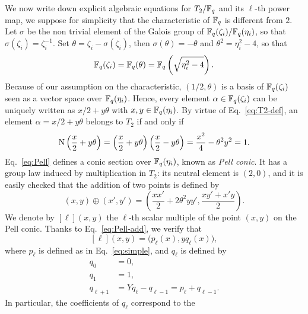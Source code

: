 \documentclass{sig-alternate}
\begin{document}
We now write down explicit algebraic equations for $T_2/\mathbb{F}_q$ and its
$\ell$-th power map, we suppose for simplicity that the characteristic
of $\mathbb{F}_q$ is different from $2$. Let $\sigma$ be the non trivial
element of the Galois group of $\mathbb{F}_q(\zeta_i)/\mathbb{F}_q(\eta_i)$, so that
$\sigma(\zeta_i)=\zeta_i^{-1}$. Set $\theta = \zeta_i -
\sigma(\zeta_i)$, then $\sigma(\theta)=-\theta$ and $\theta^2 =
\eta_i^2-4$, so that
\begin{equation}
  \mathbb{F}_q(\zeta_i) = \mathbb{F}_q(\theta) = \mathbb{F}_q\left(\sqrt{\eta_i^2-4}\right).
\end{equation}
Because of our assumption on the characteristic, $(1/2, \theta)$ is a
basis of $\mathbb{F}_q(\zeta_i)$ seen as a vector space over
$\mathbb{F}_q(\eta_i)$. Hence, every element $\alpha\in\mathbb{F}_q(\zeta_i)$ can be
uniquely written as $x/2 + y\theta$ with $x,y\in\mathbb{F}_q(\eta_i)$. By
virtue of Eq.~\eqref{eq:T2-def}, an element $\alpha=x/2+y\theta$
belongs to $T_2$ if and only if
\begin{equation}
  \label{eq:Pell}
  \operatorname{N}\left(\frac{x}{2} + y\theta\right) = 
  \left(\frac{x}{2} + y\theta\right)\left(\frac{x}{2} - y\theta\right) =
  \frac{x^2}{4} - \theta^2y^2 = 1.
\end{equation}
Eq.~\eqref{eq:Pell} defines a conic section over $\mathbb{F}_q(\eta_i)$, known
as \emph{Pell conic}. It has a group law induced by multiplication in
$T_2$: its neutral element is $(2,0)$, and it is easily checked that
the addition of two points is defined by
\begin{equation}
  \label{eq:Pell-add}
  (x,y)\oplus(x',y') =
  \left(\frac{xx'}{2} + 2\theta^2yy', \frac{xy' + x'y}{2}\right).
\end{equation}
We denote by $[\ell](x,y)$ the $\ell$-th scalar multiple of the point
$(x,y)$ on the Pell conic. Thanks to Eq.~\eqref{eq:Pell-add}, we
verify that
\begin{equation}
  \label{eq:Pell-rec}
  [\ell](x,y) = \bigr(p_\ell(x), yq_\ell(x)\bigl),
\end{equation}
where $p_\ell$ is defined as in Eq.~\eqref{eq:simple}, and $q_\ell$ is
defined by
\begin{equation}
  \label{eq:fibonacci}
  \begin{aligned}
    q_0 &= 0,\\
    q_1 &= 1,\\
    q_{\ell+1} &= Yq_{\ell} - q_{\ell-1} = p_\ell + q_{\ell-1}.
  \end{aligned}
\end{equation}
In particular, the coefficients of $q_\ell$ correspond to the
\end{document}
